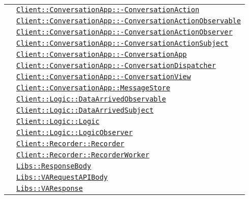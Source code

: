 \begin{longtable}{|>{\centering}m{3cm}|m{10cm}<{\centering}|}
& \hyperref[Client::ConversationApp::ConversationAction]{\texttt{Client::ConversationApp::-\linebreak ConversationAction}}\\
& \hyperref[Client::ConversationApp::ConversationActionObservable]{\texttt{Client::ConversationApp::-\linebreak ConversationActionObservable}}\\
& \hyperref[Client::ConversationApp::ConversationActionObserver]{\texttt{Client::ConversationApp::-\linebreak ConversationActionObserver}}\\
& \hyperref[Client::ConversationApp::ConversationActionSubject]{\texttt{Client::ConversationApp::-\linebreak ConversationActionSubject}}\\
& \hyperref[Client::ConversationApp::ConversationApp]{\texttt{Client::ConversationApp::-\linebreak ConversationApp}}\\
& \hyperref[Client::ConversationApp::ConversationDispatcher]{\texttt{Client::ConversationApp::-\linebreak ConversationDispatcher}}\\
& \hyperref[Client::ConversationApp::ConversationView]{\texttt{Client::ConversationApp::-\linebreak ConversationView}}\\
& \hyperref[Client::ConversationApp::MessageStore]{\texttt{Client::ConversationApp::MessageStore}}\\
& \hyperref[Client::Logic::DataArrivedObservable]{\texttt{Client::Logic::DataArrivedObservable}}\\
& \hyperref[Client::Logic::DataArrivedSubject]{\texttt{Client::Logic::DataArrivedSubject}}\\
& \hyperref[Client::Logic::Logic]{\texttt{Client::Logic::Logic}}\\
& \hyperref[Client::Logic::LogicObserver]{\texttt{Client::Logic::LogicObserver}}\\
& \hyperref[Client::Recorder::Recorder]{\texttt{Client::Recorder::Recorder}}\\
& \hyperref[Client::Recorder::RecorderWorker]{\texttt{Client::Recorder::RecorderWorker}}\\
& \hyperref[Libs::ResponseBody]{\texttt{Libs::ResponseBody}}\\
& \hyperref[Libs::VARequestAPIBody]{\texttt{Libs::VARequestAPIBody}}\\
& \hyperref[Libs::VAResponse]{\texttt{Libs::VAResponse}}\\ \hline


\end{longtable}
